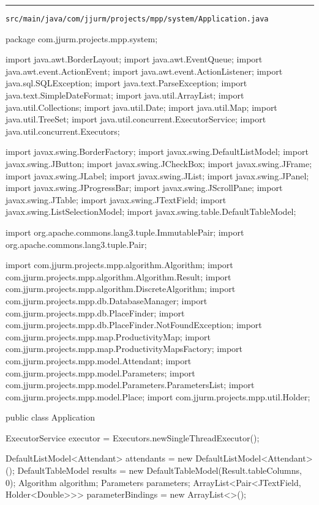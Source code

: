 \noindent\rule{\textwidth}{0.4pt}

\nointerlineskip
\texttt{src/main/java/com/jjurm/projects/mpp/system/Application.java}

\begin{javacode}
package com.jjurm.projects.mpp.system;

import java.awt.BorderLayout;
import java.awt.EventQueue;
import java.awt.event.ActionEvent;
import java.awt.event.ActionListener;
import java.sql.SQLException;
import java.text.ParseException;
import java.text.SimpleDateFormat;
import java.util.ArrayList;
import java.util.Collections;
import java.util.Date;
import java.util.Map;
import java.util.TreeSet;
import java.util.concurrent.ExecutorService;
import java.util.concurrent.Executors;

import javax.swing.BorderFactory;
import javax.swing.DefaultListModel;
import javax.swing.JButton;
import javax.swing.JCheckBox;
import javax.swing.JFrame;
import javax.swing.JLabel;
import javax.swing.JList;
import javax.swing.JPanel;
import javax.swing.JProgressBar;
import javax.swing.JScrollPane;
import javax.swing.JTable;
import javax.swing.JTextField;
import javax.swing.ListSelectionModel;
import javax.swing.table.DefaultTableModel;

import org.apache.commons.lang3.tuple.ImmutablePair;
import org.apache.commons.lang3.tuple.Pair;

import com.jjurm.projects.mpp.algorithm.Algorithm;
import com.jjurm.projects.mpp.algorithm.Algorithm.Result;
import com.jjurm.projects.mpp.algorithm.DiscreteAlgorithm;
import com.jjurm.projects.mpp.db.DatabaseManager;
import com.jjurm.projects.mpp.db.PlaceFinder;
import com.jjurm.projects.mpp.db.PlaceFinder.NotFoundException;
import com.jjurm.projects.mpp.map.ProductivityMap;
import com.jjurm.projects.mpp.map.ProductivityMapsFactory;
import com.jjurm.projects.mpp.model.Attendant;
import com.jjurm.projects.mpp.model.Parameters;
import com.jjurm.projects.mpp.model.Parameters.ParametersList;
import com.jjurm.projects.mpp.model.Place;
import com.jjurm.projects.mpp.util.Holder;

public class Application {

  ExecutorService executor = Executors.newSingleThreadExecutor();

  DefaultListModel<Attendant> attendants = new DefaultListModel<Attendant>();
  DefaultTableModel results = new DefaultTableModel(Result.tableColumns, 0);
  Algorithm algorithm;
  Parameters parameters;
  ArrayList<Pair<JTextField, Holder<Double>>> parameterBindings = new ArrayList<>();

}
\end{javacode}
